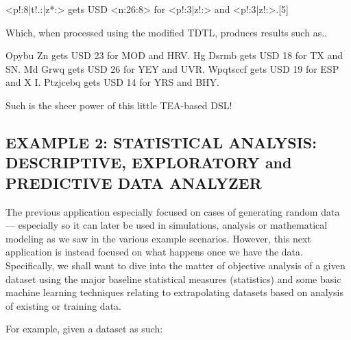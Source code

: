 \documentclass[a4paper, 18pt]{book} %
\begin{document}
 
  
   \begin{tcbverbatim}[title=Example non-JSON Document Format Data Generation Schema]
<p!:8|t!.:|z*:> gets USD <n:26:8> for <p!:3|z!:> and <p!:3|z!:>.[5]
  \end{tcbverbatim}

 \vspace{2em}
 
 Which, when processed using the modified TDTL, produces results such as..
 
 
      \begin{tcbverbatim}[title=Example of Output TDTL with Modified Language and Template]

 Opybu Zn gets USD 23 for MOD and HRV. 
 Hg Dsrmb gets USD 18 for  TX and  SN. 
 Md  Grwq gets USD 26 for YEY and UVR. 
 Wpqtsccf gets USD 19 for ESP and X I. 
 Ptzjcebq gets USD 14 for YRS and BHY. 

  \end{tcbverbatim} 
 
 
 \vspace{2em}
 
 Such is the sheer power of this little TEA-based DSL!
 
 

\subsection{EXAMPLE 2: \textbf{STATISTICAL ANALYSIS:} DESCRIPTIVE, EXPLORATORY and PREDICTIVE DATA ANALYZER}
\label{SECEXAMP2N}



The previous application especially focused on cases of generating random data --- especially so it can later be used in simulations, analysis or mathematical modeling as we saw in the various example scenarios. However, this next application is instead focused on what happens once we have the data. Specifically, we shall want to dive into the matter of objective analysis of a given dataset using the major baseline statistical measures (statistics) and some basic machine learning techniques relating to extrapolating datasets based on analysis of existing or training data.


\vspace{2em}


For example, given a dataset as such:


  \begin{tcolorbox}[title=Sample INPUT Dataset of 20 Random Numbers (Ages),  breakable,listing options={basicstyle=\ttfamily, breaklines=true, breakatwhitespace=true}]
[12,24,95,18,85,27,97,39,80,20,65,24,93,82,85,81,52,62,20,89]
  \end{tcolorbox}
  
\end{document}
